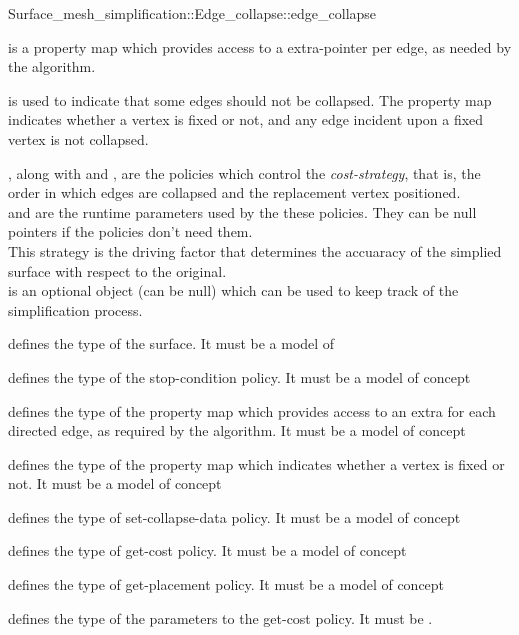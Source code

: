 \begin{ccRefFunction}{Surface_mesh_simplification::Edge_collapse::edge_collapse}
{ is a property map which provides access
to a  extra-pointer per edge, as needed by the algorithm.

 is used to indicate that some edges should not be
collapsed. The property map indicates whether a vertex is fixed or not,
and any edge incident upon a fixed vertex is not collapsed.

, along with  and ,
are the policies which control the {\em cost-strategy}, that is, 
the order in which edges are collapsed and the replacement vertex positioned.\\
 and  are the runtime 
parameters used by the these policies. They can be null pointers
if the policies don't need them.\\
This strategy is the driving factor that determines the accuaracy of the
simplied surface with respect to the original.\\

 is an optional object (can be null) which can be used
to keep track of the simplification process.
}


 defines the type of the surface.
It must be a model of 

 defines the type of the stop-condition policy.
It must be a model of  concept

 defines the type of the property map which 
provides access to an extra  for each directed edge,
as required by the algorithm.
It must be a model of  concept

 defines the type of the property map which 
indicates whether a vertex is fixed or not.
It must be a model of  concept

 defines the type of set-collapse-data policy.
It must be a model of  concept

 defines the type of get-cost policy.
It must be a model of  concept

 defines the type of get-placement policy.
It must be a model of  concept

 defines the type of the parameters to the get-cost policy.
It must be .


\end{ccRefFunction}
